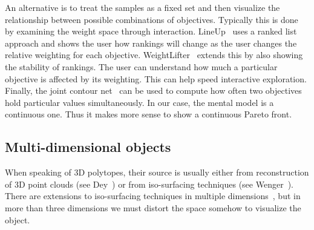 An alternative is to treat the samples as a fixed set and then visualize the
relationship between possible combinations of objectives. Typically this is
done by examining the weight space through interaction. 
LineUp~\cite{Gratzl:2013} uses a ranked list approach and shows the user
how rankings will change as the user changes the relative weighting for each
objective. WeightLifter~\cite{Pajer:2016} extends this by also showing the
stability of rankings. The user can understand how much a particular objective
is affected by its weighting. This can help speed interactive exploration. 
Finally, the joint contour net~\cite{Carr:2014} can be used to compute how
often two objectives hold particular values simultaneously. 
In our case, the mental model is a continuous one. Thus it makes more sense
to show a continuous Pareto front.

\subsection{Multi-dimensional objects}



When speaking of 3D polytopes, their source is usually either from reconstruction of 3D point clouds 
(see Dey~\cite{Dey:2006})
or from iso-surfacing techniques (see Wenger~\cite{Wenger:2013}).
%
There are extensions to iso-surfacing techniques in multiple dimensions~\cite{Bhaniramka:2000}, 
but in more than three dimensions we must distort the space somehow to visualize the object. 


